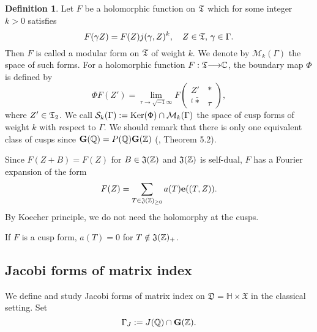 \documentclass[11pt]{amsart}
\numberwithin{equation}{section}
\theoremstyle{definition}
\newtheorem{defin}[theorem]{Definition}
\begin{document}
\begin{defin} Let $F$ be a holomorphic function on $\frak T$ which for some integer $k>0$ satisfies
$$F(\gamma Z)=F(Z) j(\gamma,Z)^k,\quad Z\in \frak T,\, \gamma\in\Gamma.
$$
Then $F$ is called a modular form on $\frak T$ of weight $k$. We denote by $\mathcal{M}_k(\Gamma)$ the space of such forms. 
For a holomorphic function $F:\frak T{\longrightarrow} {\mathbb{C}}$, 
the boundary map $\Phi$ is defined by 
$$\Phi F(Z')=\lim_{\tau\to \sqrt{-1}\infty}
F\left(\begin{array}{cc}
Z' & \ast \\
{}^t\bar{\ast} & \tau
\end{array}
\right),
$$
where $Z'\in \frak T_2$.
We call $\mathcal{S}_k({\Gamma}):={\rm Ker}(\Phi)\cap \mathcal{M}_k(\Gamma)$ the space of cusp forms of weight $k$ with respect to ${\Gamma}$. 
We should remark that there is only one equivalent class of cusps since $\bold{G}({\mathbb{Q}})=P({\mathbb{Q}})\bold{G}({\mathbb{Z}})$ (\cite{B}, Theorem 5.2). 
\end{defin}

Since $F(Z+B)=F(Z)$ for $B\in \frak J({\mathbb{Z}})$ and $\frak J({\mathbb{Z}})$ is self-dual, $F$ has a Fourier expansion of the form
\begin{equation}\label{FC}
F(Z)=\sum_{T\in \frak J({\mathbb{Z}})_{\geq 0}} a(T) \bold{e}((T,Z)).
\end{equation}
By Koecher principle, we do not need the holomorphy at the cusps. 

If $F$ is a cusp form, $a(T)=0$ for $T\notin \frak J({\mathbb{Z}})_+$.
  
\subsection{Jacobi forms of matrix index}
We define and study Jacobi forms of matrix index on $\mathfrak{D}=\mathbb{H}\times \mathfrak{X}$ in the classical setting. 
Set 
$$\Gamma_J:=J({\mathbb{Q}})\cap \bold G({\mathbb{Z}}).
$$
 
\end{document}
